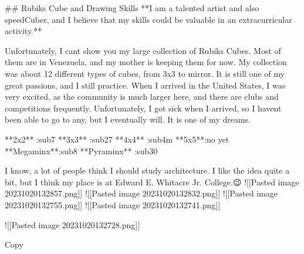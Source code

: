 \documentclass[
]{article}
\newenvironment{Shaded}{}{}
\newcommand{\NormalTok}[1]{#1}
\begin{document}
\begin{Shaded}
\begin{Highlighting}[]
\NormalTok{\#\# Rubik\textquotesingle{}s Cube and Drawing Skills}
\NormalTok{**I am a talented artist and also speedCuber, and I believe that my skills could be valuable in an extracurricular activity.**}

\NormalTok{Unfortunately, I can\textquotesingle{}t show you my large collection of Rubik\textquotesingle{}s Cubes. Most of them are in Venezuela, and my mother is keeping them for now. My collection was about 12 different types of cubes, from 3x3 to mirror. It is still one of my great passions, and I still practice. When I arrived in the United States, I was very excited, as the community is much larger here, and there are clubs and competitions frequently. Unfortunately, I got sick when I arrived, so I haven\textquotesingle{}t been able to go to any, but I eventually will. It is one of my dreams.}

\NormalTok{**2x2** :sub7}
\NormalTok{**3x3** :sub27}
\NormalTok{**4x4** :sub4m}
\NormalTok{**5x5**:no yet}
\NormalTok{**Megaminx**:sub8}
\NormalTok{**Pyraminx** :sub30}

\NormalTok{I know, a lot of people think I should study architecture. I like the idea quite a bit, but I think my place is at Edward E. Whitacre Jr. College.😉}
\NormalTok{![[Pasted image 20231020132857.png]]}
\NormalTok{![[Pasted image 20231020132832.png]]}
\NormalTok{![[Pasted image 20231020132755.png]]}
\NormalTok{![[Pasted image 20231020132741.png]]}

\NormalTok{![[Pasted image 20231020132728.png]]}





\NormalTok{Copy}
\end{Highlighting}
\end{Shaded}
\end{document}
